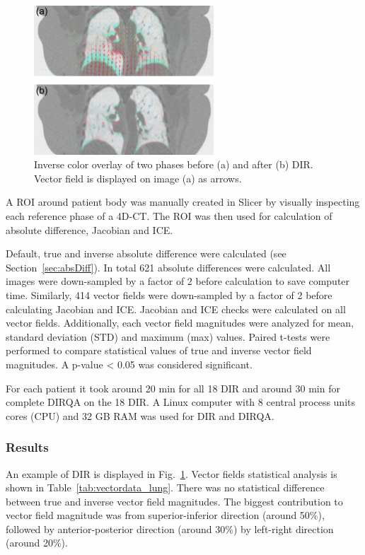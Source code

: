 \documentclass[type=dr, dr=rernat, accentcolor=tud7b,colorbacktitle, bigchapter, openright, twoside, 12pt ]{tudthesis}
\begin{document}
\begin{figure}[H]
	\begin{center}		
		\includegraphics[width=0.6\textwidth]{./Images/exampleReg.png}
		\caption{Inverse color overlay of two phases before (a) and after (b) DIR. Vector field is displayed on image (a) as arrows.}
		\label{exampleReg_lung}
	\end{center}
\end{figure}

A ROI around patient body was manually created in Slicer by visually inspecting each reference phase of a 4D-CT. The ROI was then used for calculation of absolute difference, Jacobian and ICE.

Default, true and inverse absolute difference were calculated (see Section~\ref{sec:absDiff}). In total 621 absolute differences were calculated. All images were down-sampled by a factor of 2
before calculation to save computer time. Similarly, 414 vector fields were down-sampled by a factor of 2 before calculating Jacobian and ICE. Jacobian and ICE checks were calculated on all vector fields.
Additionally, each vector field magnitudes were analyzed for mean, standard deviation (STD) and maximum (max) values. Paired t-tests were performed to compare statistical values of true and inverse vector field magnitudes.
A p-value < 0.05 was considered significant. 


For each patient it took around 20 min for all 18 DIR and around 30 min for complete DIRQA on the 18 DIR. A Linux computer with 8 central process units cores (CPU) and 32 GB RAM was used for DIR and DIRQA.


\subsubsection{Results}

An example of DIR is displayed in Fig.~\ref{exampleReg_lung}. Vector fields statistical analysis is shown in Table~\ref{tab:vectordata_lung}. There was no statistical
difference between true and inverse vector field magnitudes. The biggest contribution to vector field magnitude was from superior-inferior direction (around 50\%), followed by anterior-posterior direction (around 30\%)
by left-right direction (around 20\%).
\end{document}

